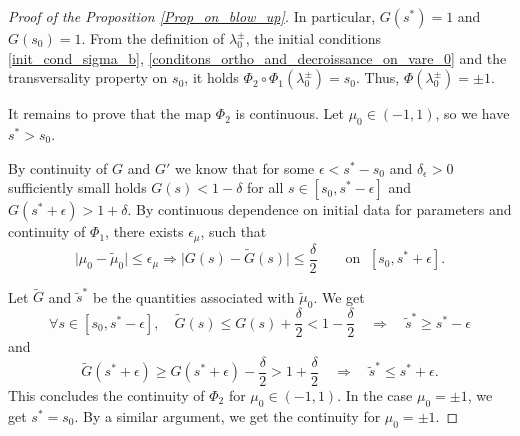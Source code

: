\documentclass[16pt,english, oneside,reqno]{smfart}
\renewcommand{\tilde}{\widetilde}
\begin{document}
\begin{proof}[Proof of the Proposition \ref{Prop_on_blow_up}]
In particular, $G(s^*) = 1$ and $G(s_0) = 1$. From the definition of $\lambda^{\pm}_0$, the initial conditions \eqref{init_cond_sigma_b}, \eqref{conditons_ortho_and_decroissance_on_vare_0} and the transversality property on $s_0$, it holds $\Phi_2 \circ \Phi_1 (\lambda^{\pm}_0) = s_0$. Thus, $\Phi(\lambda^{\pm}_0)= \pm1$.


It remains to prove that the map $\Phi_2$ is continuous. Let $\mu_0\in (-1,1)$, so we have $s^* > s_0$. 

By continuity of $G$ and $G'$ we know that for some $\epsilon <s^*-s_0$ and $\delta_\epsilon>0$ sufficiently small holds $G(s)<1-\delta$ for all $s \in [s_0,s^*-\epsilon]$ and $G(s^*+\epsilon)> 1+\delta$. 
By continuous dependence on initial data for parameters and continuity of $\Phi_1$, there exists $\epsilon_\mu$, such that 
\begin{equation}
    \lvert \mu_0 - \tilde{\mu}_0\rvert\leq \epsilon_\mu \Rightarrow \lvert G(s) - \tilde{G}(s) \rvert \leq \frac{\delta}{2} \qquad 
    \text{on }\;[s_0,s^*+\epsilon].
\end{equation}

Let $\tilde{G}$ and $\tilde{s}^*$ be the quantities associated with $\tilde{\mu}_0$. 
We get 
\begin{equation*}
    \forall s \in [s_0,s^*-\epsilon], \quad  \tilde{G}(s) \leq G(s)+\frac{\delta}{2} < 1-\frac{\delta}{2} \quad\Rightarrow\quad \tilde{s}^* \geq s^*-\epsilon
\end{equation*}
and
\begin{equation*}
    \tilde{G}(s^*+\epsilon)\geq G(s^*+\epsilon)-\frac{\delta}{2} >1+\frac{\delta}{2} \quad\Rightarrow\quad \tilde{s}^* \leq s^*+\epsilon.
\end{equation*}
This concludes the continuity of $\Phi_2$ for $\mu_0 \in (-1,1)$. In the case $\mu_0 = \pm1$, we get $s^* = s_0$. By a similar argument, we get the continuity for $\mu_0 = \pm1$.
\end{proof}
\end{document}

